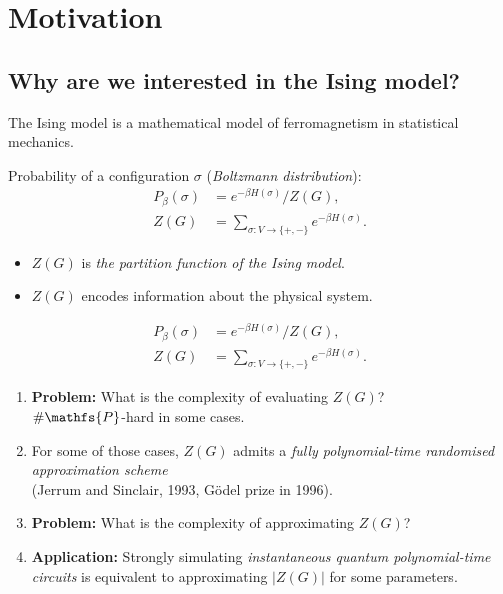 
\section*{Motivation}

\subsection*{Why are we interested in the Ising model?}

\begin{frame}
	  	The Ising model is a mathematical model of ferromagnetism in statistical mechanics.

    Probability of a configuration $\sigma$ ({\color{TurkishRose}\textit{Boltzmann distribution}}):
    \begin{align*}
    P_\beta(\sigma) & = e^{-\beta H(\sigma)} / Z(G), \\ 
    Z(G) & = \sum_{\sigma \colon V \to \{+,-\}} e^{- \beta H(\sigma)}.
    \end{align*}
    
    \begin{itemize}
    	\item $Z(G)$ is \textit{the partition function of the Ising model}.
    	\item $Z(G)$ encodes information about the physical system.
    \end{itemize}
\end{frame}


\begin{frame}
		     \begin{align*}
		     P_\beta(\sigma) & = e^{-\beta H(\sigma)} / Z(G), \\ 
		     Z(G) & = \sum_{\sigma \colon V \to \{+,-\}} e^{- \beta H(\sigma)}.
		     \end{align*}
		     
	\begin{enumerate}			
		\item {\color{TurkishRose} \textbf{Problem:}} What is the complexity of evaluating $Z(G)$? \\
		$\# \mathfs{P}$-hard in some cases.
		
		\item For some of those cases, $Z(G)$ admits a \textit{fully polynomial-time randomised approximation scheme} \\
		(Jerrum and Sinclair, 1993,  G\"odel prize in 1996).
		
		\item {\color{TurkishRose} \textbf{Problem:}} What is the complexity of approximating $Z(G)$?
		
		\item {\color{TurkishRose} \textbf{Application:}}  Strongly simulating \textit{instantaneous quantum polynomial-time circuits} is equivalent to approximating $|Z(G)|$ for some parameters.
	\end{enumerate}
\end{frame}

